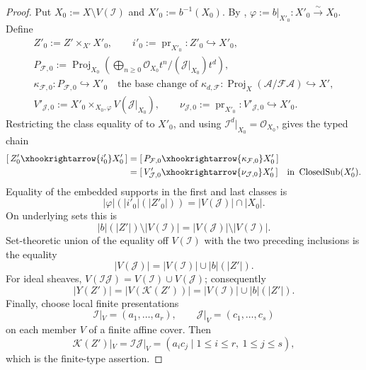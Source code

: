 \begin{proof}
  Put $X_0:=X\setminus V(\mathcal I)$ and
  $X'_0:=b^{-1}(X_0)$.  By
  ,
  $\varphi:=b|_{X'_0}\colon X'_0\xrightarrow{\sim}X_0$.  Define
  \[
  \begin{gathered}
    Z'_0:=Z'\times_{X'}X'_0,
    \qquad i'_0:=\operatorname{pr}_{X'_0}\colon Z'_0\hookrightarrow X'_0,\\
    P_{\mathcal F,0}:=
      \operatorname{Proj}_{X_0}\!\left(
        \bigoplus_{n\ge0}\mathcal O_{X_0}t^n
          \big/ (\mathcal J|_{X_0})t^d\right),\\
    \kappa_{\mathcal F,0}\colon P_{\mathcal F,0}\hookrightarrow X'_0
      \quad\text{the base change of }
      \kappa_{d,\mathcal F}\colon
        \operatorname{Proj}_X(\mathcal A/\mathcal F\mathcal A)
          \hookrightarrow X',\\
    V'_{\mathcal J,0}:=
      X'_0\times_{X_0,\varphi}V(\mathcal J|_{X_0}),
    \qquad
    \nu_{\mathcal J,0}:=\operatorname{pr}_{X'_0}\colon
      V'_{\mathcal J,0}\hookrightarrow X'_0.
  \end{gathered}                                                   \tag{CCI0}
  \]
  Restricting the class equality of
   to $X'_0$, and using
  $\mathcal I^d|_{X_0}=\mathcal O_{X_0}$, gives the typed chain
  \[
  \begin{aligned}
    [\,Z'_0\xhookrightarrow{i'_0}X'_0\,]
      &=[\,P_{\mathcal F,0}
        \xhookrightarrow{\kappa_{\mathcal F,0}}X'_0\,]\\
      &=[\,V'_{\mathcal J,0}
        \xhookrightarrow{\nu_{\mathcal J,0}}X'_0\,]
      \quad\text{in }\operatorname{ClosedSub}(X'_0).
  \end{aligned}
  \]
  Equality of the embedded supports in the first and last classes is
  \[
    |\varphi|\!\left(|i'_0|(|Z'_0|)\right)
      =|V(\mathcal J)|\cap|X_0|.
  \]
  On underlying sets this is
  \[
    |b|(|Z'|)\setminus|V(\mathcal I)|
      =|V(\mathcal J)|\setminus|V(\mathcal I)|.
  \]
  Set-theoretic union of the equality off $V(\mathcal I)$ with the two
  preceding inclusions is the equality
  \[
    |V(\mathcal J)|
      =|V(\mathcal I)|\cup |b|(|Z'|).
  \]
  For ideal sheaves, $V(\mathcal I\mathcal J)=
  V(\mathcal I)\cup V(\mathcal J)$; consequently
  \[
    |Y(Z')|=|V(\mathcal K(Z'))|
      =|V(\mathcal I)|\cup |b|(|Z'|).
  \]
  Finally, choose local finite presentations
  \[
    \mathcal I|_V=(a_1,\ldots,a_r),
    \qquad
    \mathcal J|_V=(c_1,\ldots,c_s)
  \]
  on each member $V$ of a finite affine cover.  Then
  \[
    \mathcal K(Z')|_V
      =\mathcal I\mathcal J|_V
      =(a_ic_j\mid1\leq i\leq r,\ 1\leq j\leq s),
  \]
  which is the finite-type assertion.
\end{proof}


